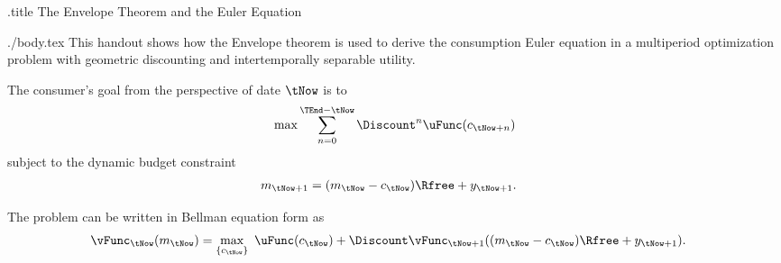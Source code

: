 \documentclass{handout}
\begin{document}
\handoutHeader
 

\begin{verbatimwrite}{\jobname.title}
The Envelope Theorem and the Euler Equation
\end{verbatimwrite}

\handoutNameMake

\begin{verbatimwrite}{./body.tex}
This handout shows how the Envelope theorem is used to derive the
consumption Euler equation in a multiperiod optimization problem with
geometric discounting and intertemporally separable utility.

The consumer's goal from the perspective of date $\tNow$ is to 
\begin{equation}
        \max \sum_{n=0}^{\TEnd-\tNow} \Discount^{n} \uFunc(c_{\tNow+n})
\end{equation}
subject to the dynamic budget constraint
\begin{equation}\begin{gathered}\begin{aligned}
 {m}_{\tNow+1} & =  ({m}_{\tNow}-{c}_{\tNow})\Rfree + {y}_{\tNow+1}. \label{eq:xaccum}
\end{aligned}\end{gathered}\end{equation}

The problem can be written in Bellman equation form as
\begin{equation}\begin{gathered}\begin{aligned}
        \vFunc_{\tNow}({m}_{\tNow}) & =  \max_{\{{c}_{\tNow}\}} ~\uFunc({c}_{\tNow}) + \Discount \vFunc_{\tNow+1}(({m}_{\tNow}-{c}_{\tNow})\Rfree+{y}_{\tNow+1}). \label{eq:bellman}
\end{aligned}\end{gathered}\end{equation}


\end{verbatimwrite}
\end{document}
